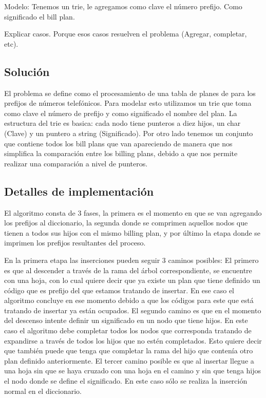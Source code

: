 Modelo: Tenemos un trie, le agregamos como clave el número prefijo. Como significado
el bill plan.

Explicar casos. Porque esos casos resuelven el problema (Agregar, completar, etc).

\subsection*{Solución}

El problema se define como el procesamiento de una tabla de planes de para los
prefijos de números telefónicos. Para modelar esto utilizamos un trie que toma como clave 
el número de prefijo y como significado el nombre del plan. 
La estructura del trie es basica: cada nodo tiene punteros a diez hijos, un char (Clave) y un
puntero a string (Significado).
Por otro lado tenemos un conjunto que contiene todos los bill plans que van apareciendo
de manera que nos simplifica la comparación entre los billing plans, debido a que 
nos permite realizar una comparación a nivel de punteros.

\subsection*{Detalles de implementación}

El algoritmo consta de 3 fases, la primera es el momento en que se van agregando los prefijos
al diccionario, la segunda donde se comprimen aquellos nodos que tienen a todos sus hijos
con el mismo billing plan, y por último la etapa donde se imprimen los prefijos resultantes 
del proceso.

En la primera etapa las inserciones pueden seguir 3 caminos posibles:
El primero es que al descender a través de la rama del árbol correspondiente, 
se encuentre con una hoja, con lo cual quiere decir que ya existe un plan que tiene definido
un código que es prefijo del que estamos tratando de insertar. En ese caso el algoritmo 
concluye en ese momento debido a que los códigos para este que está tratando de insertar ya están
ocupados.
El segundo camino es que en el momento del descenso intente definir un significado en un nodo que tiene
hijos. En este caso el algoritmo debe completar todos los nodos que corresponda tratando de expandirse
a través de todos los hijos que no estén completados. Esto quiere decir que también puede que tenga que completar 
la rama del hijo que contenía otro plan definido anteriormente.
El tercer camino posible es que al insertar llegue a una hoja sin que se haya cruzado con una hoja en el camino
y sin que tenga hijos el nodo donde se define el significado. En este caso sólo se realiza la inserción 
normal en el diccionario.

